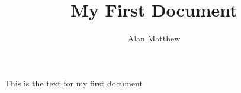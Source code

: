 \documentclass{article}
\title{My First Document}
\author{Alan Matthew}
\date{}
\begin{document}
\maketitle

This is the text for my first document
\end{document}
